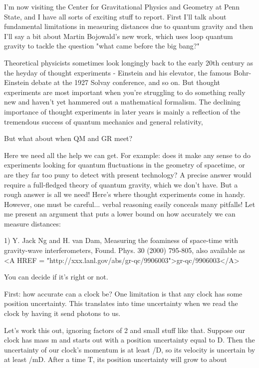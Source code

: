 


I'm now visiting the Center for Gravitational Physics and Geometry at
Penn State, and I have all sorts of exciting stuff to report.  First 
I'll talk about fundamental limitations in measuring distances due 
to quantum gravity and then I'll say a bit about Martin Bojowald's 
new work, which uses loop quantum gravity to tackle the question 
"what came before the big bang?"

Theoretical physicists sometimes look longingly back to the early 20th
century as the heyday of thought experiments - Einstein and his
elevator, the famous Bohr-Einstein debate at the 1927 Solvay
conference, and so on.  But thought experiments are most important
when you're struggling to do something really new and haven't yet
hammered out a mathematical formalism.  The declining importance of
thought experiments in later years is mainly a reflection of the
tremendous success of quantum mechanics and general relativity,

But what about when QM and GR meet?

Here we need all the help we can get.  For example: does it make any
sense to do experiments looking for quantum fluctuations in the
geometry of spacetime, or are they far too puny to detect with present
technology?  A precise answer would require a full-fledged theory of
quantum gravity, which we don't have.  But a rough answer is all we
need!  Here's where thought experiments come in handy.  However, one
must be careful...  verbal reasoning easily conceals many pitfalls!
Let me present an argument that puts a lower bound on how accurately
we can measure distances:

1) Y. Jack Ng and H. van Dam, Measuring the foaminess of space-time
with gravity-wave interferometers, Found. Phys. 30 (2000) 795-805,
also available as <A HREF = "http://xxx.lanl.gov/abs/gr-qc/9906003">gr-qc/9906003</A>

You can decide if it's right or not.   

First: how accurate can a clock be?  One limitation is that any clock
has some position uncertainty.  This translates into time uncertainty
when we read the clock by having it send photons to us.

Let's work this out, ignoring factors of 2 and small stuff like that.
Suppose our clock has mass m and starts out with a position
uncertainty equal to D.  Then the uncertainty of our clock's momentum
is at least \hbar /D, so its velocity is uncertain by at least \hbar /mD.
After a time T, its position uncertainty will grow to about


